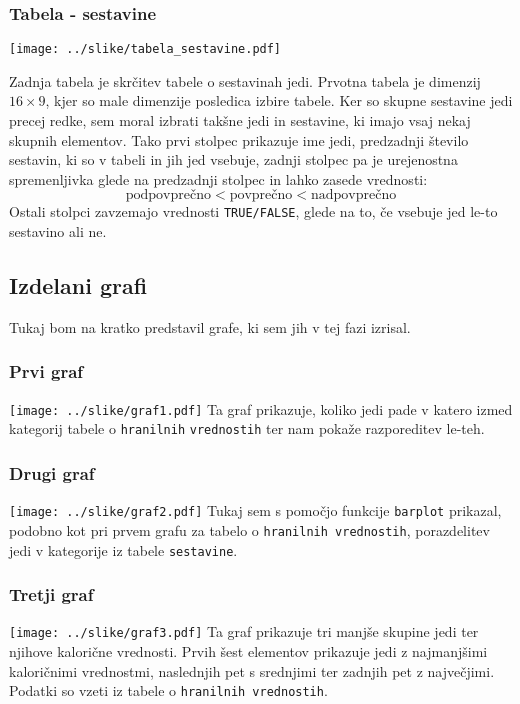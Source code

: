 \documentclass[11pt,a4paper]{article}
\begin{document}
\subsubsection{Tabela - sestavine}
\vspace{5mm}
\texttt{[image: ../slike/tabela\_sestavine.pdf]}
\vspace{5mm}

Zadnja tabela je skrčitev tabele o sestavinah jedi. Prvotna tabela je dimenzij $16 \times 9$, kjer so male dimenzije posledica izbire tabele. Ker so skupne sestavine jedi precej redke, sem moral izbrati takšne jedi in sestavine, ki imajo vsaj nekaj skupnih elementov. Tako prvi stolpec prikazuje ime jedi, predzadnji število sestavin, ki so v tabeli in jih jed vsebuje, zadnji stolpec pa je urejenostna spremenljivka glede na predzadnji stolpec in lahko zasede vrednosti: $$\mbox{podpovprečno} < \mbox{povprečno} < \mbox{nadpovprečno}$$
Ostali stolpci zavzemajo vrednosti \verb|TRUE/FALSE|, glede na to, če vsebuje jed le-to sestavino ali ne. \par

\newpage
\subsection{Izdelani grafi}
Tukaj bom na kratko predstavil grafe, ki sem jih v tej fazi izrisal.

\subsubsection{Prvi graf}
\texttt{[image: ../slike/graf1.pdf]}
Ta graf prikazuje, koliko jedi pade v katero izmed kategorij tabele o \verb|hranilnih|  \verb|vrednostih| ter nam pokaže razporeditev le-teh.

\subsubsection{Drugi graf}
\texttt{[image: ../slike/graf2.pdf]}
Tukaj sem s pomočjo funkcije \verb|barplot| prikazal, podobno kot pri prvem grafu za tabelo o \verb|hranilnih vrednostih|, porazdelitev jedi v kategorije iz tabele \verb|sestavine|.

\subsubsection{Tretji graf}
\texttt{[image: ../slike/graf3.pdf]}
Ta graf prikazuje tri manjše skupine jedi ter njihove kalorične vrednosti. Prvih šest elementov prikazuje jedi z najmanjšimi kaloričnimi vrednostmi, naslednjih pet s srednjimi ter zadnjih pet z največjimi. Podatki so vzeti iz tabele o \verb|hranilnih vrednostih|.
\end{document}
